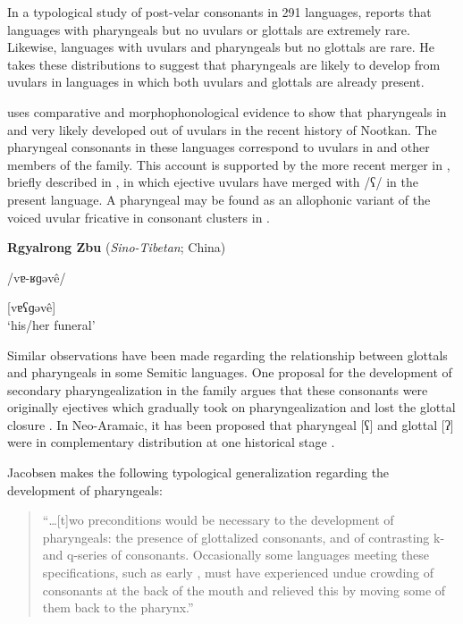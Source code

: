   In a typological study of post-velar consonants in 291 languages, \citet[49]{Sylak-Glassman2014} reports that languages with pharyngeals but no uvulars or glottals are extremely rare. Likewise, languages with uvulars and pharyngeals but no glottals are rare. He takes these distributions to suggest that pharyngeals are likely to develop from uvulars in languages in which both uvulars and glottals are already present.

  \citet{Jacobsen1969} uses comparative and morphophonological evidence to show that pharyngeals in  and  very likely developed out of uvulars in the recent history of Nootkan. The pharyngeal consonants in these languages correspond to uvulars in  and other members of the family. This account is supported by the more recent merger in , briefly described in , in which ejective uvulars have merged with /ʕ/ in the present language. A pharyngeal may be found as an allophonic variant of the voiced uvular fricative in consonant clusters in  .

\ea\label{ex:4.47}
  \textbf{Rgyalrong Zbu} (\textit{Sino-Tibetan}; China)

/vɐ-ʁɡəvê/

[vɐʕɡəvê]\\
\glt ‘his/her funeral’
\citep[62]{Gong2018}
\z

  Similar observations have been made regarding the relationship between glottals and pharyngeals in some Semitic languages. One proposal for the development of secondary pharyngealization in the family argues that these consonants were originally ejectives which gradually took on pharyngealization and lost the glottal closure \citep{Zemánek1996}. In Neo-Aramaic, it has been proposed that pharyngeal [ʕ] and glottal [ʔ] were in complementary distribution at one historical stage \citep{Hoberman1985}.

  Jacobsen makes the following typological generalization regarding the development of pharyngeals:

\begin{quote}
“…[t]wo preconditions would be necessary to the development of pharyngeals: the presence of glottalized consonants, and of contrasting k- and q-series of consonants. Occasionally some languages meeting these specifications, such as early , must have experienced undue crowding of consonants at the back of the mouth and relieved this by moving some of them back to the pharynx.” 
\citep[152]{Jacobsen1969}
\end{quote}

